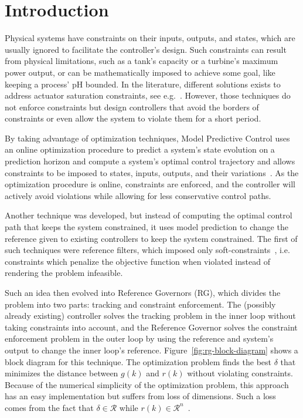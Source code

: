 
\chapter{Introduction}%
\label{chp:introduction}

Physical systems have constraints on their inputs, outputs, and states, which
are usually ignored to facilitate the controller's design. Such constraints can
result from physical limitations, such as a tank's capacity or a turbine's
maximum power output, or can be mathematically imposed to achieve some goal,
like keeping a process' pH bounded. In the literature, different solutions
exists to address actuator saturation constraints, see
e.g.~\parencite{klug.castelan.ea:fuzzy,tarbouriech.garcia.ea:stability}.
However, those techniques do not enforce constraints but design controllers that
avoid the borders of constraints or even allow the system to violate them for a
short period.

By taking advantage of optimization techniques, Model Predictive Control uses an
online optimization procedure to predict a system's state evolution on a
prediction horizon and compute a system's optimal control trajectory and allows
constraints to be imposed to states, inputs, outputs, and their
variations~\parencite{wang:model,zhang:fast}. As the optimization procedure is
online, constraints are enforced, and the controller will actively avoid
violations while allowing for less conservative control paths.

Another technique was developed, but instead of computing the optimal control
path that keeps the system constrained, it uses model prediction to change the
reference given to existing controllers to keep the system constrained. The
first of such techniques were reference filters, which imposed only
soft-constraints~\parencite{vahidi.kolmanovsky.ea:constraint}, i.e. constraints
which penalize the objective function when violated instead of rendering the
problem infeasible.

Such an idea then evolved into Reference Governors (RG), which divides the
problem into two parts: tracking and constraint enforcement. The (possibly
already existing) controller solves the tracking problem in the inner loop
without taking constraints into account, and the Reference Governor solves the
constraint enforcement problem in the outer loop by using the reference and
system's output to change the inner loop's reference.
Figure~\ref{fig:rg-block-diagram} shows a block diagram for this technique. The
optimization problem finds the best \(\delta\) that minimizes the distance between
\(g(k)\) and \(r(k)\) without violating constraints. Because of the numerical
simplicity of the optimization problem, this approach has an easy implementation
but suffers from loss of dimensions. Such a loss comes from the fact that
\(\delta\in\mathcal{R}\) while
\(r(k)\in\mathcal{R}^n\)~\parencite{gilbert.kolmanovsky:fast}.

